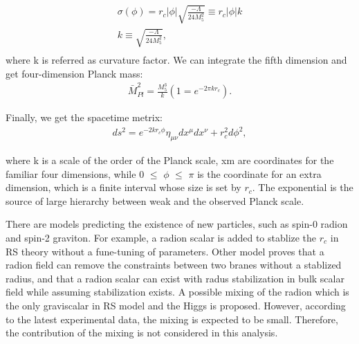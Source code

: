 \begin{equation} \label{eq1}
\begin{split}
\sigma(\phi)=r_{c}|\phi | \sqrt{\frac{-\Lambda}{24M^2_5}}\equiv r_c|\phi |k \\
k\equiv  \sqrt{\frac{-\Lambda}{24M^2_5}}, \\
\end{split}
\end{equation}
where k is referred as curvature factor. We can integrate the fifth dimension and get four-dimension Planck mass: 
\begin{equation} \label{eq1}
\begin{split}
\bar{M}^2_{Pl}=\frac{M^3_5}{k}(1=e^{-2\pi kr_c}).
\end{split}
\end{equation}

Finally, we get the spacetime metrix:  
\begin{equation} \label{eq1}
\begin{split}
ds^2 = e^{-2kr_c\phi}\eta_{\mu\nu}dx^{\mu}dx^{\nu} + r^2_{c}d\phi^2, 
\end{split}
\end{equation}


where k is a scale of the order of the Planck scale, xm are
coordinates for the familiar four dimensions, while 0 $\leq$ $\phi$ $\leq$ $\pi$ is the coordinate for an extra dimension, which is
a finite interval whose size is set by $r_c$. The exponential is the source of large hierarchy between weak and the observed Planck scale.  



There are models predicting the existence of new particles, such as spin-0 radion and spin-2 graviton\citep{Davoudiasl:1999jd,Agashe:2007zd,Fitzpatrick:2007qr}. For example, a radion scalar is added to stablize the $r_c$ in RS theory without a fune-tuning of parameters\citep{Goldberger:1999uk}. Other model proves that
a radion field can remove the constraints between two branes without a stablized radius\citep{Csaki:1999mp}, and that 
a radion scalar can exist with radus stabilization in bulk scalar field while assuming stabilization exists\citep{Csaki:2000zn}.
A possible mixing of the radion which is the only graviscalar in RS model and the Higgs is proposed\citep{Giudice:2000av}.
However, according to the latest experimental data, the mixing is expected to be small. Therefore, the contribution of the mixing is not considered in this analysis\citep{Desai:2013pga}.

